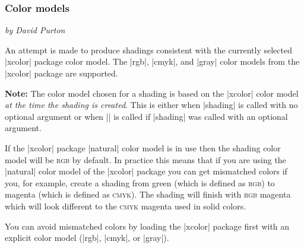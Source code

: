 \subsubsection{Color models}

\noindent\emph{by David Purton}

An attempt is made to produce shadings consistent with the currently selected
|xcolor| package color model. The |rgb|, |cmyk|, and |gray| color models from
the |xcolor| package are supported.

\textbf{Note:} The color model chosen for a shading is based on the |xcolor|
color model \emph{at the time the shading is created}. This is either when
|\pgfdeclare*shading| is called with no optional argument or when
|\pgfuseshading| is called if |\pgfdeclare*shading| was called with an
optional argument.

If the |xcolor| package |natural| color model is in use then the shading color
model will be \textsc{rgb} by default. In practice this means that if you are
using the |natural| color model of the |xcolor| package you can get mismatched
colors if you, for example, create a shading from green (which is defined as
\textsc{rgb}) to magenta (which is defined as \textsc{cmyk}). The shading will
finish with \textsc{rgb} magenta which will look different to the
\textsc{cmyk} magenta used in solid colors.

You can avoid mismatched colors by loading the |xcolor| package first with an
explicit color model (|rgb|, |cmyk|, or |gray|).

\begin{codeexample}
\end{codeexample}

